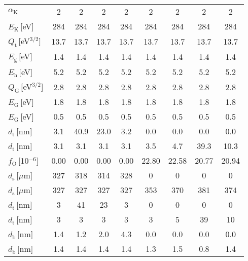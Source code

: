 \begin{tabular}{lcccccccc}
$\alpha_\mathrm{K}$ & 2 & 2 & 2 & 2 & 2 & 2 & 2 & 2\\
$E_\mathrm{K}$\,[eV] & 284 & 284 & 284 & 284 & 284 & 284 & 284 & 284\\
$Q_\mathrm{t}$\,[eV$^{3/2}$] & 13.7 & 13.7 & 13.7 & 13.7 & 13.7 & 13.7 & 13.7 & 13.7\\
$E_\mathrm{g}$\,[eV] & 1.4 & 1.4 & 1.4 & 1.4 & 1.4 & 1.4 & 1.4 & 1.4\\
$E_\mathrm{h}$\,[eV] & 5.2 & 5.2 & 5.2 & 5.2 & 5.2 & 5.2 & 5.2 & 5.2\\
$Q_\mathrm{G}$\,[eV$^{3/2}$] & 2.8 & 2.8 & 2.8 & 2.8 & 2.8 & 2.8 & 2.8 & 2.8\\
$E_\mathrm{G}$\,[eV] & 1.8 & 1.8 & 1.8 & 1.8 & 1.8 & 1.8 & 1.8 & 1.8\\
$E_\mathrm{G}$\,[eV] & 0.5 & 0.5 & 0.5 & 0.5 & 0.5 & 0.5 & 0.5 & 0.5\\
$d_\mathrm{t}$\,[nm] & 3.1 & 40.9 & 23.0 & 3.2 & 0.0 & 0.0 & 0.0 & 0.0\\
$d_\mathrm{t}$\,[nm] & 3.1 & 3.1 & 3.1 & 3.1 & 3.5 & 4.7 & 39.3 & 10.3\\
$f_\mathrm{O}$\,[10$^{-6}$] & 0.00 & 0.00 & 0.00 & 0.00 & 22.80 & 22.58 & 20.77 & 20.94\\
$d_\mathrm{s}$\,[$\mu$m] & 327 & 318 & 314 & 328 & 0 & 0 & 0 & 0\\
$d_\mathrm{s}$\,[$\mu$m] & 327 & 327 & 327 & 327 & 353 & 370 & 381 & 374\\
$d_\mathrm{t}$\,[nm] & 3 & 41 & 23 & 3 & 0 & 0 & 0 & 0\\
$d_\mathrm{t}$\,[nm] & 3 & 3 & 3 & 3 & 3 & 5 & 39 & 10\\
$d_\mathrm{b}$\,[nm] & 1.4 & 1.2 & 2.0 & 4.3 & 0.0 & 0.0 & 0.0 & 0.0\\
$d_\mathrm{b}$\,[nm] & 1.4 & 1.4 & 1.4 & 1.4 & 1.3 & 1.5 & 0.8 & 1.4\\
\hline
\end{tabular}
